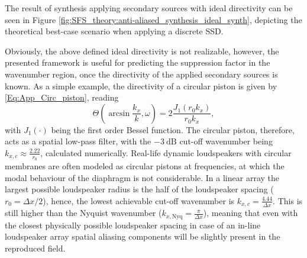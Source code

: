 The result of synthesis applying secondary sources with ideal directivity can be seen in Figure \ref{fig:SFS_theory:anti-aliased_synthesis_ideal_synth}, depicting the theoretical best-case scenario when applying a discrete SSD.

\vspace{3mm}
Obviously, the above defined ideal directivity is not realizable, however, the presented framework is useful for predicting the suppression
factor in the wavenumber region, once the directivity of the applied secondary sources is known.
As a simple example, the directivity of a circular piston is given by \eqref{Eq:App_Circ_piston}, reading
\begin{equation}
\Theta(\arcsin \frac{k_x}{k},\omega) = 2\frac{J_1\left( r_0 k_x\right)}{r_0 k_x},
\end{equation}
with $J_1(\cdot)$ being the first order Bessel function.
The circular piston, therefore, acts as a spatial low-pass filter, with the $-3~\mathrm{dB}$ cut-off wavenumber being $k_{x,c} \approx \frac{2.22}{r_0}$, calculated numerically.
Real-life dynamic loudspeakers with circular membranes are often modeled as circular pistons at frequencies, at which the modal behaviour of the diaphragm is not considerable.
In a linear array the largest possible loudspeaker radius is the half of the loudspeaker spacing ($r_0 = \Delta x/2$), hence, the lowest achievable cut-off wavenumber is 
$k_{x,c} = \frac{4.44}{\Delta x}$.
This is still higher than the Nyquist wavenumber ($k_{x,\mathrm{Nyq}} = \frac{\pi}{\Delta x}$), meaning that even with the closest physically possible loudspeaker spacing in case of an in-line loudspeaker array spatial aliasing components will be slightly present in the reproduced field.